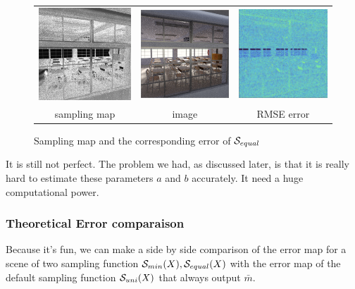 \documentclass{classeENS}
\begin{document}
\begin{figure}[H]
    \centering
    \caption{Sampling map and the corresponding error of $\mathcal S_{equal}$}
    \begin{tabular}{ccc}
    \includegraphics[width=45mm]{image/without/sm.png}
    & \includegraphics[width=45mm]{image/without/normal.png}
    & \includegraphics[width=45mm]{image/without/RMSE_mean.png} \\
    sampling map & image & RMSE error
    \end{tabular}
\end{figure}

It is still not perfect. The problem we had, as discussed later, is that it 
is really hard to estimate these parameters $a$ and $b$ accurately. It need 
a huge computational power.

\subsubsection{Theoretical Error comparaison}

Because it's fun, we can make a side by side comparison of the error map for a scene of 
two sampling function $\mathcal S_{min}(X), \mathcal S_{equal}(X)$ with the error map
of the default sampling function $\mathcal S_{uni}(X)$ that always output $\bar m$.
\end{document}
